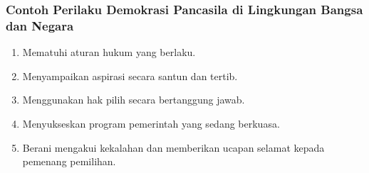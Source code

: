 \subsubsection{Contoh Perilaku Demokrasi Pancasila di Lingkungan Bangsa dan Negara}
\begin{enumerate}
\item Mematuhi aturan hukum yang berlaku.
\item Menyampaikan aspirasi secara santun dan tertib.
\item Menggunakan hak pilih secara bertanggung jawab.
\item Menyukseskan program pemerintah yang sedang berkuasa.
\item Berani mengakui kekalahan dan memberikan ucapan selamat kepada pemenang pemilihan.
\end{enumerate}
